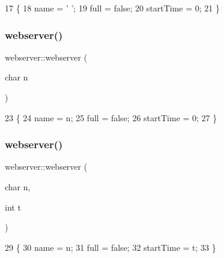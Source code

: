 \begin{DoxyCode}
17                     \{
18             name = \textcolor{charliteral}{' '};
19             full = \textcolor{keyword}{false};
20             startTime = 0;
21         \}
\end{DoxyCode}
\mbox{\label{classwebserver_a31eed476ee2971a92e877923ea7c97fc}} 
\subsubsection{\texorpdfstring{webserver()}{webserver()}\hspace{0.1cm}{\footnotesize\ttfamily [2/3]}}
{\footnotesize\ttfamily webserver\+::webserver (\begin{DoxyParamCaption}\item[{char}]{n }\end{DoxyParamCaption})\hspace{0.3cm}{\ttfamily [inline]}}


\begin{DoxyCode}
23                           \{
24             name = n;
25             full = \textcolor{keyword}{false};
26             startTime = 0;
27         \}
\end{DoxyCode}
\mbox{\label{classwebserver_abf14dc8da82c8ba9277a25a18aaabaef}} 
\subsubsection{\texorpdfstring{webserver()}{webserver()}\hspace{0.1cm}{\footnotesize\ttfamily [3/3]}}
{\footnotesize\ttfamily webserver\+::webserver (\begin{DoxyParamCaption}\item[{char}]{n,  }\item[{int}]{t }\end{DoxyParamCaption})\hspace{0.3cm}{\ttfamily [inline]}}


\begin{DoxyCode}
29                                  \{
30             name = n;
31             full = \textcolor{keyword}{false};
32             startTime = t;
33         \}
\end{DoxyCode}


